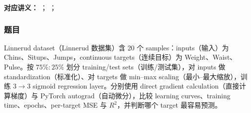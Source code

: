 
\textbf{对应讲义：}
；
；

\subsubsection*{题目}

Linnerud dataset（Linnerud 数据集）含 20 个 samples：inputs（输入）为 Chins、Situps、Jumps，continuous targets（连续目标）为 Weight、Waist、Pulse。按 $75\%:25\%$ 划分 training/test sets（训练/测试集），对 inputs 做 standardization（标准化）、对 targets 做 min--max scaling（最小--最大缩放），训练 $3\rightarrow3$ sigmoid regression layer。分别使用 direct gradient calculation（直接计算梯度）与 PyTorch autograd（自动微分），比较 learning curves、training time、epochs、per-target MSE 与 $R^2$，并判断哪个 target 最容易预测。


